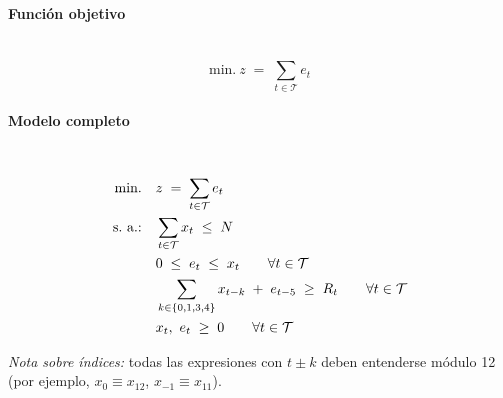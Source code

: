 \paragraph{Función objetivo}\mbox{}\\
\begin{equation}
\mbox{min.}\ z \;=\; \sum_{t\in\mathcal{T}} e_t
\end{equation}

\paragraph{Modelo completo}\mbox{}\\
\begin{align}
\mbox{min.}\quad & z \;=\; \sum_{t\in\mathcal{T}} e_t \notag \\
\mbox{s.\ a.:}\quad 
& \sum_{t\in\mathcal{T}} x_t \;\leq\; N \notag \\
& 0 \;\leq\; e_t \;\leq\; x_t \qquad \forall t\in\mathcal{T} \notag \\
& \sum_{k\in\{0,1,3,4\}} x_{t-k} \;+\; e_{t-5} \;\geq\; R_t \qquad \forall t\in\mathcal{T} \notag \\
& x_t,\ e_t \;\geq\; 0 \qquad \forall t\in\mathcal{T} \notag
\end{align}

\medskip
\textit{Nota sobre índices:} todas las expresiones con $t\pm k$ deben entenderse módulo 12 (por ejemplo, $x_{0}\equiv x_{12}$, $x_{-1}\equiv x_{11}$).
